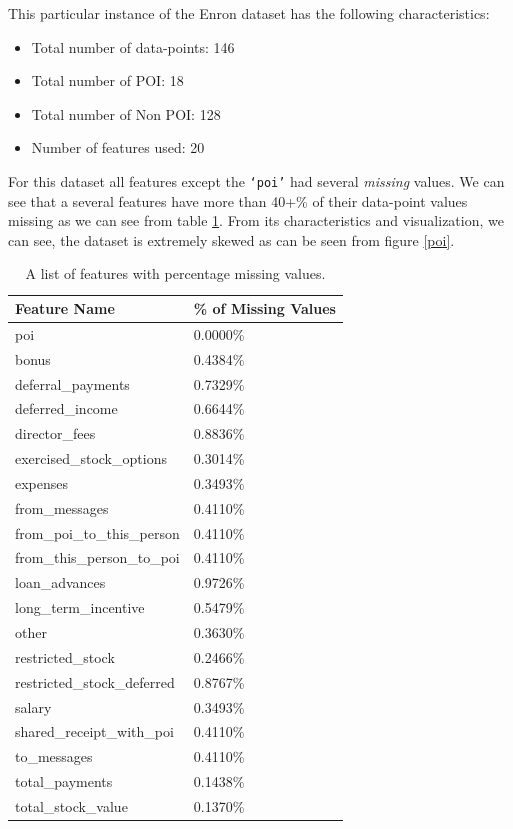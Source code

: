 \documentclass[twoside,openright,titlepage,numbers=noenddot,headinclude,%
               footinclude=true,cleardoublepage=empty,abstractoff,BCOR=5mm,%
               paper=a4,fontsize=11pt,ngerman,american]{scrreprt}
\numberwithin{theorem}{chapter}
\numberwithin{definition}{chapter}
\numberwithin{algorithm}{chapter}
\numberwithin{figure}{chapter}
\numberwithin{table}{chapter}
\numberwithin{equation}{chapter}
\begin{document}
This particular instance of the Enron dataset has the following characteristics:
\begin{itemize}
    \item Total number of data-points: 146
    \item Total number of POI: 18
    \item Total number of Non POI: 128
    \item Number of features used: 20
\end{itemize} 
For this dataset all features except the \texttt{`poi'} had several \textit{missing} values. We can see that a several features have more than 40+\% of their data-point values missing as we can see from table \ref{tableFeatureMissing}. From its characteristics and visualization, we can see, the dataset is extremely skewed as can be seen from figure \ref{poi}. 
\begin{table}[!htbp]
  \begin{center}
  \caption{A list of features with percentage missing values.}
    \begin{tabular}{ |p{5cm}|p{3cm}| } 
    \hline
    Feature Name &  \% of \textbf{Missing} Values\\[1ex]

    \hline
    poi                            & 0.0000\% \\
    bonus                          & 0.4384\% \\
    deferral\_payments              & 0.7329\% \\
    deferred\_income                & 0.6644\% \\
    director\_fees                  & 0.8836\% \\
    exercised\_stock\_options        & 0.3014\% \\
    expenses                       & 0.3493\% \\
    from\_messages                  & 0.4110\% \\
    from\_poi\_to\_this\_person        & 0.4110\% \\
    from\_this\_person\_to\_poi        & 0.4110\% \\
    loan\_advances                  & 0.9726\% \\
    long\_term\_incentive            & 0.5479\% \\
    other                          & 0.3630\% \\
    restricted\_stock               & 0.2466\% \\
    restricted\_stock\_deferred      & 0.8767\% \\
    salary                         & 0.3493\% \\
    shared\_receipt\_with\_poi        & 0.4110\% \\
    to\_messages                    & 0.4110\% \\
    total\_payments                 & 0.1438\% \\
    total\_stock\_value              & 0.1370\% \\
    \hline
    \end{tabular}
    \label{tableFeatureMissing}
  \end{center}
\end{table}
\end{document}
